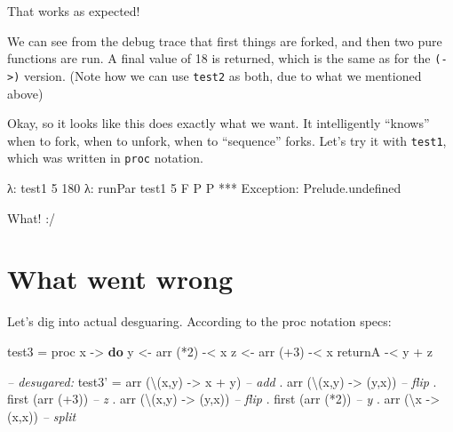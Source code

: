 \documentclass[]{article}
\newenvironment{Shaded}{}{}
\newcommand{\KeywordTok}[1]{\textcolor[rgb]{0.00,0.44,0.13}{\textbf{#1}}}
\newcommand{\DataTypeTok}[1]{\textcolor[rgb]{0.56,0.13,0.00}{#1}}
\newcommand{\DecValTok}[1]{\textcolor[rgb]{0.25,0.63,0.44}{#1}}
\newcommand{\CommentTok}[1]{\textcolor[rgb]{0.38,0.63,0.69}{\textit{#1}}}
\newcommand{\OtherTok}[1]{\textcolor[rgb]{0.00,0.44,0.13}{#1}}
\newcommand{\FunctionTok}[1]{\textcolor[rgb]{0.02,0.16,0.49}{#1}}
\newcommand{\NormalTok}[1]{#1}
\begin{document}
That works as expected!

We can see from the debug trace that first things are forked, and then two pure
functions are run. A final value of 18 is returned, which is the same as for the
\texttt{(-\textgreater{})} version. (Note how we can use \texttt{test2} as both,
due to what we mentioned above)

Okay, so it looks like this does exactly what we want. It intelligently
``knows'' when to fork, when to unfork, when to ``sequence'' forks. Let's try it
with \texttt{test1}, which was written in \texttt{proc} notation.

\begin{Shaded}
\begin{Highlighting}[]
\NormalTok{λ}\FunctionTok{:}\NormalTok{ test1 }\DecValTok{5}
\DecValTok{180}
\NormalTok{λ}\FunctionTok{:}\NormalTok{ runPar test1 }\DecValTok{5}
\DataTypeTok{F}
\DataTypeTok{P}
\DataTypeTok{P}
\FunctionTok{***} \DataTypeTok{Exception}\FunctionTok{:}\NormalTok{ Prelude.undefined}
\end{Highlighting}
\end{Shaded}

What! :/

\section{What went wrong}\label{what-went-wrong}

Let's dig into actual desguaring. According to the proc notation specs:

\begin{Shaded}
\begin{Highlighting}[]
\NormalTok{test3 }\FunctionTok{=}\NormalTok{ proc x }\OtherTok{->} \KeywordTok{do}
\NormalTok{    y }\OtherTok{<-}\NormalTok{ arr (}\FunctionTok{*}\DecValTok{2}\NormalTok{) }\FunctionTok{-<}\NormalTok{ x}
\NormalTok{    z }\OtherTok{<-}\NormalTok{ arr (}\FunctionTok{+}\DecValTok{3}\NormalTok{) }\FunctionTok{-<}\NormalTok{ x}
\NormalTok{    returnA }\FunctionTok{-<}\NormalTok{ y }\FunctionTok{+}\NormalTok{ z}

\CommentTok{-- desugared:}
\NormalTok{test3' }\FunctionTok{=}\NormalTok{ arr (\textbackslash{}(x,y) }\OtherTok{->}\NormalTok{ x }\FunctionTok{+}\NormalTok{ y)     }\CommentTok{-- add}
       \FunctionTok{.}\NormalTok{ arr (\textbackslash{}(x,y) }\OtherTok{->}\NormalTok{ (y,x))     }\CommentTok{-- flip}
       \FunctionTok{.}\NormalTok{ first (arr (}\FunctionTok{+}\DecValTok{3}\NormalTok{))          }\CommentTok{-- z}
       \FunctionTok{.}\NormalTok{ arr (\textbackslash{}(x,y) }\OtherTok{->}\NormalTok{ (y,x))     }\CommentTok{-- flip}
       \FunctionTok{.}\NormalTok{ first (arr (}\FunctionTok{*}\DecValTok{2}\NormalTok{))          }\CommentTok{-- y}
       \FunctionTok{.}\NormalTok{ arr (\textbackslash{}x }\OtherTok{->}\NormalTok{ (x,x))         }\CommentTok{-- split}
\end{Highlighting}
\end{Shaded}
\end{document}

